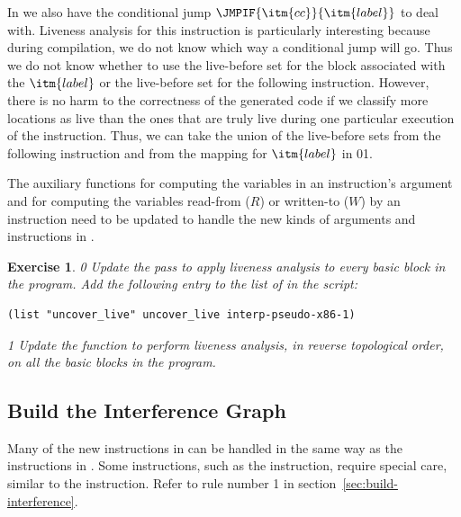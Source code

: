 \documentclass[7x10]{TimesAPriori_MIT}%
\def\racketEd{0}
\def\pythonEd{1}
\def\edition{1}
\newcommand{\racket}[1]{{\if\edition\racketEd{#1}\fi}}
\newcommand{\pythonColor}[0]{}
\newcommand{\python}[1]{{\if\edition\pythonEd\pythonColor #1\fi}}
\newtheorem{exercise}[theorem]{Exercise}
\numberwithin{theorem}{chapter}
\numberwithin{definition}{chapter}
\numberwithin{equation}{chapter}
\begin{document}
In \LangXIfVar{} we also have the conditional jump
$\JMPIF{\itm{cc}}{\itm{label}}$ to deal with.  Liveness analysis for
this instruction is particularly interesting because during
compilation, we do not know which way a conditional jump will go. Thus
we do not know whether to use the live-before set for the block
associated with the $\itm{label}$ or the live-before set for the
following instruction.  However, there is no harm to the correctness
of the generated code if we classify more locations as live than the
ones that are truly live during one particular execution of the
instruction. Thus, we can take the union of the live-before sets from
the following instruction and from the mapping for $\itm{label}$ in
\racket{}\python{}.

The auxiliary functions for computing the variables in an
instruction's argument and for computing the variables read-from ($R$)
or written-to ($W$) by an instruction need to be updated to handle the
new kinds of arguments and instructions in \LangXIfVar{}.

\begin{exercise}\normalfont\normalsize
{\if\edition\racketEd
%
Update the  pass to apply liveness analysis to
every basic block in the program.
%
Add the following entry to the list of  in the
 script:
\begin{lstlisting}
(list "uncover_live" uncover_live interp-pseudo-x86-1)
\end{lstlisting}
\fi}

{\if\edition\pythonEd\pythonColor
%
Update the  function to perform liveness analysis,
in reverse topological order, on all the basic blocks in the
program.
%  
\fi}
\end{exercise}

\subsection{Build the Interference Graph}
\label{sec:build-interference-Lif}

Many of the new instructions in \LangXIfVar{} can be handled in the
same way as the instructions in \LangXVar{}.
%
Some instructions, such as the  instruction, require special care,
similar to the  instruction. Refer to rule number 1 in
section~\ref{sec:build-interference}.
\end{document}
